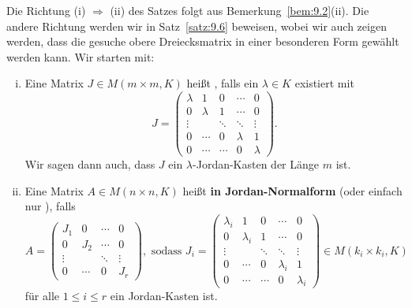 Die Richtung (i) $\Rightarrow$ (ii) des Satzes folgt aus Bemerkung~\ref{bem:9.2}(ii).
Die andere Richtung werden wir in Satz~\ref{satz:9.6} beweisen, wobei wir auch zeigen werden, dass die gesuche obere Dreiecksmatrix in einer besonderen Form gewählt werden kann.
Wir starten mit:

\begin{definition}
	\label{def:9.5}
	\begin{enumerate}[(i)]
		\item Eine Matrix $J \in M(m \times m, K)$ heißt , falls ein $\lambda \in K$ existiert mit
		\[
			J = \begin{pmatrix}
			\lambda & 1 & 0 & \cdots & 0 \\ 
			0 & \lambda & 1 & \cdots & 0 \\ 
			\vdots &  & \ddots & \ddots & \vdots \\ 
			0 & \cdots & 0 & \lambda & 1 \\ 
			0 & \cdots & \cdots & 0 & \lambda
			\end{pmatrix}.
		\]
		Wir sagen dann auch, dass $J$ ein $\lambda$-Jordan-Kasten der Länge $m$ ist.
		\item Eine Matrix $A \in M(n \times n,K)$ heißt \textbf{in Jordan-Normalform} (oder einfach nur ), falls 
		\[
			A = \begin{pmatrix}
			J_1 & 0 & \cdots & 0 \\ 
			0 & J_2 & \cdots & 0 \\ 
			\vdots &  & \ddots & \vdots \\ 
			0 & \cdots & 0 & J_r
			\end{pmatrix}, \text{ sodass }
			J_i = \begin{pmatrix}
			\lambda_i & 1 & 0 & \cdots & 0 \\ 
			0 & \lambda_i & 1 & \cdots & 0 \\ 
			\vdots &  & \ddots & \ddots & \vdots \\ 
			0 & \cdots & 0 & \lambda_i & 1 \\ 
			0 & \cdots & \cdots & 0 & \lambda_i
			\end{pmatrix} \in M(k_i \times k_i,K)
		\]
		für alle $1 \leq i \leq r$ ein Jordan-Kasten ist.
	\end{enumerate}
\end{definition}

